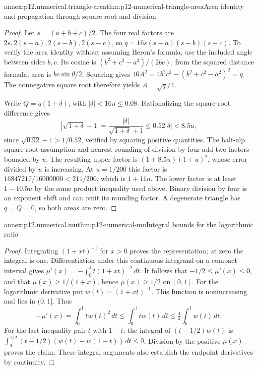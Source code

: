 \begin{annexitem}{annex:p12.numerical.triangle-area}{thm:p12-numerical-triangle-area}{Area identity and propagation through square root and division}
\begin{proof}
Let \(s=(a+b+c)/2\). The four real factors are
\(2s,2(s-a),2(s-b),2(s-c)\), so
\(q=16s(s-a)(s-b)(s-c)\). To verify the area identity without
assuming Heron's formula, use the included angle between sides \(b,c\).
Its cosine is \((b^2+c^2-a^2)/(2bc)\), from the squared distance
formula; area is \(bc\sin\theta/2\). Squaring gives
\(16A^2=4b^2c^2-(b^2+c^2-a^2)^2=q\).
The nonnegative square root therefore yields \(A=\sqrt q/4\).

Write \(Q=q(1+\delta)\), with \(|\delta|<16u\leq0.08\).
Rationalizing the square-root difference gives
\[
 |\sqrt{1+\delta}-1|
 =\frac{|\delta|}{\sqrt{1+\delta}+1}
 \leq0.52|\delta|<8.5u,
\]
since \(\sqrt{0.92}+1>1/0.52\), verified by squaring positive
quantities. The half-ulp square-root assumption and nearest rounding
of division by four add two factors bounded by \(u\). The resulting upper factor
is \((1+8.5u)(1+u)^2\), whose error divided by \(u\) is increasing.
At \(u=1/200\) this factor is \(16847217/16000000<211/200\),
which is \(1+11u\). The lower factor is at least \(1-10.5u\)
by the same product inequality used above. Binary division by four is
an exponent shift and can omit its rounding factor. A degenerate
triangle has \(q=Q=0\), so both areas are zero.
\end{proof}
\end{annexitem}

\begin{annexitem}{annex:p12.numerical.mu}{thm:p12-numerical-mu}{Integral bounds for the logarithmic ratio}
\begin{proof}
Integrating \((1+xt)^{-1}\) for \(x>0\) proves the representation;
at zero the integral is one. Differentiation under this continuous
integrand on a compact interval gives
\(\mu'(x)=-\int_0^1t(1+xt)^{-2}\,dt\).
It follows that \(-1/2\leq\mu'(x)\leq0\), and that
\(\mu(x)\geq1/(1+x)\), hence \(\mu(x)\geq1/2\) on \([0,1]\).
For the logarithmic derivative put \(w(t)=(1+xt)^{-1}\).
This function is nonincreasing and lies in \((0,1]\). Thus
\[
 -\mu'(x)=\int_0^1t w(t)^2\,dt
 \leq\int_0^1t w(t)\,dt\leq\tfrac12\int_0^1w(t)\,dt.
\]
For the last inequality pair \(t\) with \(1-t\): the integral of
\((t-1/2)w(t)\) is
\(\int_0^{1/2}(t-1/2)(w(t)-w(1-t))\,dt\leq0\).
Division by the positive \(\mu(x)\) proves the claim. These integral
arguments also establish the endpoint derivatives by continuity.
\end{proof}
\end{annexitem}

